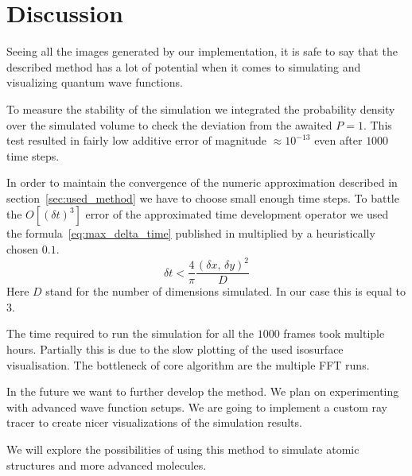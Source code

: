 \section{Discussion}

Seeing all the images generated by our implementation, it is safe to say that the described method has a lot of potential when it comes to simulating and visualizing quantum wave functions.

To measure the stability of the simulation we integrated the probability density over the simulated volume to check the deviation from the awaited
$P = 1$.
This test resulted in fairly low additive error of magnitude $\approx 10^{-13}$ even after $1000$ time steps.

In order to maintain the convergence of the numeric approximation described in section~\ref{sec:used_method} we have to choose small enough time steps.
To battle the $O\left[ (\delta{}t)^3 \right]$ error of the approximated time development operator we used the formula~\ref{eq:max_delta_time} published in \cite{mark2020webschrodinger} multiplied by a heuristically chosen $0.1$.
\begin{equation}
	\label{eq:max_delta_time}
	\delta{}t < \frac{4}{\pi} \frac{(\delta{}x,\,\delta{}y)^2}{D}
\end{equation}
Here $D$ stand for the number of dimensions simulated. In our case this is equal to $3$.

The time required to run the simulation for all the $1000$ frames took multiple hours.
Partially this is due to the slow plotting of the used isosurface visualisation.
The bottleneck of core algorithm are the multiple FFT runs.

In the future we want to further develop the method.
We plan on experimenting with advanced wave function setups.
We are going to implement a custom ray tracer to create nicer visualizations of the simulation results.

We will explore the possibilities of using this method to simulate atomic structures and more advanced molecules.


